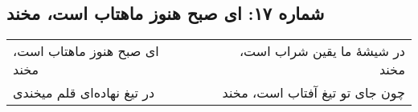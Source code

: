 \begin{center}
\section*{شماره ۱۷: ای صبح هنوز ماهتاب است، مخند}
\label{sec:017}
\begin{longtable}{l p{0.5cm} r}
ای صبح هنوز ماهتاب است، مخند
&&
در شیشهٔ ما یقین شراب است، مخند
\\
در تیغ نهاده‌ای قلم میخندی
&&
چون جای تو تیغ آفتاب است، مخند
\\
\end{longtable}
\end{center}
